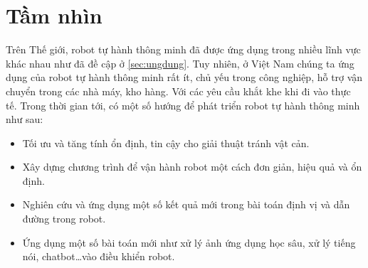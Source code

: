 \section{Tầm nhìn}
Trên Thế giới, robot tự hành thông minh đã được ứng dụng trong nhiều lĩnh vực khác nhau như đã đề cập ở \ref{sec:ungdung}. Tuy nhiên, ở Việt Nam chúng ta ứng dụng của robot tự hành thông minh rất ít, chủ yếu trong công nghiệp, hỗ trợ vận chuyển trong các nhà máy, kho hàng. Với các yêu cầu khắt khe khi đi vào thực tế. Trong thời gian tới, có một số hướng để phát triển robot tự hành thông minh như sau:
\begin{itemize}
    \item Tối ưu và tăng tính ổn định, tin cậy cho giải thuật tránh vật cản.
    \item Xây dựng chương trình để vận hành robot một cách đơn giản, hiệu quả và ổn định.
    \item Nghiên cứu và ứng dụng một số kết quả mới trong bài toán định vị và dẫn đường trong robot.
    \item Ứng dụng một số bài toán mới như xử lý ảnh ứng dụng học sâu, xử lý tiếng nói, chatbot\dots vào điều khiển robot.
\end{itemize}



